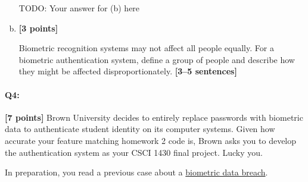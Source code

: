 \documentclass[11pt]{article}
\begin{document}
\begin{enumerate}[(a)]
\begin{tcolorbox}[colback=white!5!white,colframe=green!75!black]
{{        TODO: Your answer for (b) here %
            
        }}
    \end{tcolorbox}


    \item
    \textbf{[3 points]}
    \begin{tcolorbox}[colback=orange!5!white,colframe=orange!75!black]
    Biometric recognition systems may not affect all people equally. For a biometric authentication system, define a group of people and describe how they might be affected disproportionately. \textbf{[3--5 sentences]}
    \end{tcolorbox}
    
\end{enumerate}

\pagebreak



\paragraph{Q4:} \textbf{[7 points]} Brown University decides to entirely replace passwords with biometric data to authenticate student identity on its computer systems. Given how accurate your feature matching homework 2 code is, Brown asks you to develop the authentication system as your CSCI 1430 final project. Lucky you.

In preparation, you read a previous case about a \href{https://www.vpnmentor.com/blog/report-biostar2-leak/}{biometric data breach}.
\end{document}
